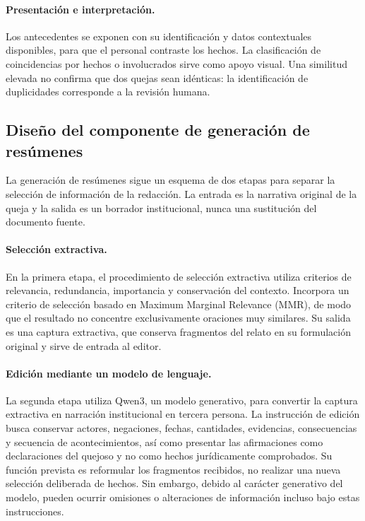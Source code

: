 	\paragraph{Presentación e interpretación.}
	Los antecedentes se exponen con su identificación y datos contextuales disponibles,
	para que el personal contraste los hechos. La clasificación de coincidencias por hechos
	o involucrados sirve como apoyo visual. Una similitud elevada no confirma que dos
	quejas sean idénticas: la identificación de duplicidades corresponde a la revisión humana.

	\subsection{Diseño del componente de generación de resúmenes}
	\label{sec:diseno_resumenes}
	La generación de resúmenes sigue un esquema de dos etapas para separar la selección de
	información de la redacción. La entrada es la narrativa original de la queja y la salida
	es un borrador institucional, nunca una sustitución del documento fuente.

	\paragraph{Selección extractiva.}
	En la primera etapa, el procedimiento de selección extractiva utiliza criterios de relevancia,
	redundancia, importancia y conservación del contexto. Incorpora un criterio de selección
	basado en Maximum Marginal Relevance (MMR), de modo que el resultado no concentre
	exclusivamente oraciones muy similares. Su salida es una captura extractiva, que
	conserva fragmentos del relato en su formulación original y sirve de entrada al editor.

	\paragraph{Edición mediante un modelo de lenguaje.}
	La segunda etapa utiliza Qwen3, un modelo generativo, para convertir la captura
	extractiva en narración institucional en tercera persona. La instrucción de edición
	busca conservar actores, negaciones, fechas, cantidades, evidencias, consecuencias y
	secuencia de acontecimientos, así como presentar las afirmaciones como declaraciones
	del quejoso y no como hechos jurídicamente comprobados. Su función prevista es
	reformular los fragmentos recibidos, no realizar una nueva selección deliberada
	de hechos. Sin embargo, debido al carácter generativo del modelo, pueden ocurrir
	omisiones o alteraciones de información incluso bajo estas instrucciones.

